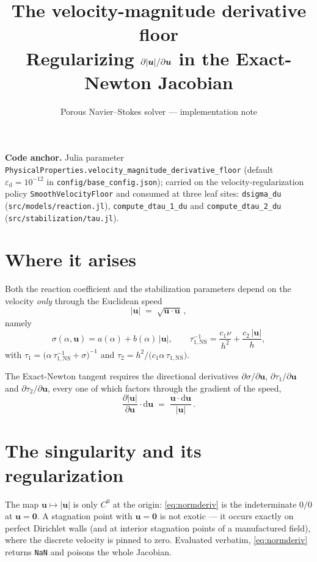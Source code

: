 \documentclass[11pt]{article}
\title{The velocity-magnitude derivative floor\\
       \large Regularizing $\partial\norm{\uu}/\partial\uu$ in the Exact-Newton Jacobian}
\author{Porous Navier--Stokes solver --- implementation note}
\date{}
\newcommand{\eps}{\varepsilon_{\mathrm{d}}}          %
\newcommand{\uu}{\bm{u}}
\newcommand{\du}{\mathrm{d}\bm{u}}
\newcommand{\norm}[1]{\lvert #1 \rvert}
\begin{document}
\maketitle

\noindent
\textbf{Code anchor.} Julia parameter \texttt{PhysicalProperties.velocity\_magnitude\_derivative\_floor}
(default $\eps = 10^{-12}$ in \texttt{config/base\_config.json}); carried on the velocity-regularization
policy \texttt{SmoothVelocityFloor} and consumed at three leaf sites:
\texttt{dsigma\_du} (\texttt{src/models/reaction.jl}),
\texttt{compute\_dtau\_1\_du} and \texttt{compute\_dtau\_2\_du} (\texttt{src/stabilization/tau.jl}).

\section{Where it arises}

Both the reaction coefficient and the stabilization parameters depend on the velocity \emph{only}
through the Euclidean speed
\begin{equation}
  \norm{\uu} \;=\; \sqrt{\uu\cdot\uu}\,,
\end{equation}
namely
\begin{equation}
  \sigma(\alpha,\uu) = a(\alpha) + b(\alpha)\,\norm{\uu},
  \qquad
  \tau_{1,\mathrm{NS}}^{-1} = \frac{c_1\nu}{h^2} + \frac{c_2\,\norm{\uu}}{h},
\end{equation}
with $\tau_1=\big(\alpha\,\tau_{1,\mathrm{NS}}^{-1}+\sigma\big)^{-1}$ and
$\tau_2 = h^2/\!\big(c_1\alpha\,\tau_{1,\mathrm{NS}}\big)$.

The Exact-Newton tangent requires the directional derivatives $\partial\sigma/\partial\uu$,
$\partial\tau_1/\partial\uu$ and $\partial\tau_2/\partial\uu$, every one of which factors through the
gradient of the speed,
\begin{equation}\label{eq:normderiv}
  \frac{\partial \norm{\uu}}{\partial \uu}\cdot\du
  \;=\; \frac{\uu\cdot\du}{\norm{\uu}}\,.
\end{equation}

\section{The singularity and its regularization}

The map $\uu\mapsto\norm{\uu}$ is only $C^0$ at the origin: \eqref{eq:normderiv} is the indeterminate
$0/0$ at $\uu=\bm 0$. A stagnation point with $\uu=\bm 0$ is not exotic --- it occurs exactly on
perfect Dirichlet walls (and at interior stagnation points of a manufactured field), where the discrete
velocity is pinned to zero. Evaluated verbatim, \eqref{eq:normderiv} returns \texttt{NaN} and poisons the
whole Jacobian.
\end{document}
